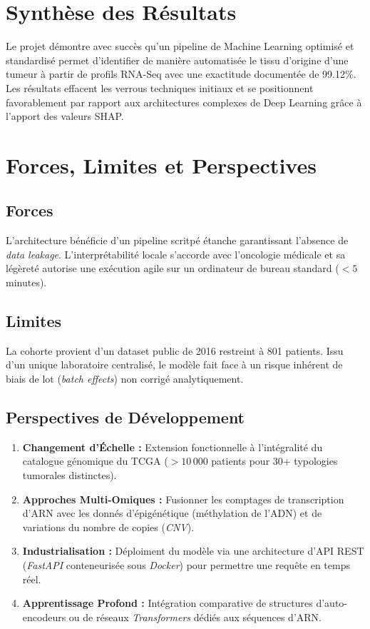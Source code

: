 \documentclass[12pt,a4paper]{report}
\begin{document}
\section{Synth\`ese des R\'esultats}
Le projet d\'emontre avec succ\`es qu'un pipeline de Machine Learning optimis\'e et standardis\'e permet d'identifier de mani\`ere automatis\'ee le tissu d'origine d'une tumeur \`a partir de profils RNA-Seq avec une exactitude document\'ee de 99.12\%. Les r\'esultats effacent les verrous techniques initiaux et se positionnent favorablement par rapport aux architectures complexes de Deep Learning gr\^ace \`a l'apport des valeurs SHAP.

\section{Forces, Limites et Perspectives}
\subsection{Forces}
L'architecture b\'en\'eficie d'un pipeline scritp\'e étanche garantissant l'absence de \textit{data leakage}. L'interpr\'etabilit\'e locale s'accorde avec l'oncologie m\'edicale et sa l\'eg\`eret\'e autorise une ex\'ecution agile sur un ordinateur de bureau standard ($<5$ minutes).

\subsection{Limites}
La cohorte provient d'un dataset public de 2016 restreint \`a 801 patients. Issu d'un unique laboratoire centralis\'e, le mod\`ele fait face \`a un risque inh\'erent de biais de lot (\textit{batch effects}) non corrig\'e analytiquement.

\subsection{Perspectives de D\'eveloppement}
\begin{enumerate}[label=\textbf{\arabic*.}]
    \item \textbf{Changement d'\'Echelle :} Extension fonctionnelle \`a l'int\'egralit\'e du catalogue g\'enomique du TCGA ($>10\,000$ patients pour 30+ typologies tumorales distinctes).
    \item \textbf{Approches Multi-Omiques :} Fusionner les comptages de transcription d'ARN avec les donn\'es d'\'epig\'en\'etique (m\'ethylation de l'ADN) et de variations du nombre de copies (\textit{CNV}).
    \item \textbf{Industrialisation :} D\'eploiment du mod\`ele via une architecture d'API REST (\textit{FastAPI} conteneuris\'ee sous \textit{Docker}) pour permettre une requ\^ete en temps r\'eel.
    \item \textbf{Apprentissage Profond :} Int\'egration comparative de structures d'auto-encodeurs ou de r\'eseaux \textit{Transformers} d\'edi\'es aux s\'equences d'ARN.
\end{enumerate}
\end{document}
